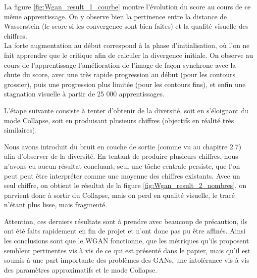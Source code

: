 	La figure \ref{fig:Wgan_result_1_courbe} montre l'évolution du score au cours de ce même apprentissage. On y observe bien la pertinence entre la distance de Wasserstein (le score si les convergence sont bien faites) et la qualité visuelle des chiffres. \\
	La forte augmentation au début correspond à la phase d'initialisation, où l'on ne fait apprendre que le critique afin de calculer la divergence initiale. On observe au cours de l'apprentissage l'amélioration de l'image de façon synchrone avec la chute du score, avec une très rapide progression au début (pour les contours grossier), puis une progression plus limitée (pour les contours fins), et enfin une stagnation visuelle à partir de 25 000 apprentissages.

	L'étape suivante consiste à tenter d'obtenir de la diversité, soit en s’éloignant du mode Collapse, soit en produisant plusieurs chiffres (objectifs en réalité très similaires). 

	Nous avons introduit du bruit en couche de sortie (comme vu au chapitre 2.7) afin d'observer de la diversité. En tentant de produire plusieurs chiffres, nous n'avons eu aucun résultat concluant, seul une tâche centrale persiste, que l'on peut peut être interpréter comme une moyenne des chiffres existants. Avec un seul chiffre, on obtient le résultat de la figure \ref{fig:Wgan_result_2_nombres}, on parvient donc à sortir du Collapse, mais on perd en qualité visuelle, le tracé n'étant plus lisse, mais fragmenté.

	Attention, ces derniers résultats sont à prendre avec beaucoup de précaution, ils ont été faits rapidement en fin de projet et n'ont donc pas pu être affinés. Ainsi les conclusions sont que le WGAN fonctionne, que les métriques qu'ils proposent semblent pertinentes vis à vis de ce qui est présenté dans le papier, mais qu'il est soumis à une part importante des problèmes des GANs, une intolérance vis à vis des paramètres approximatifs et le mode Collapse.

